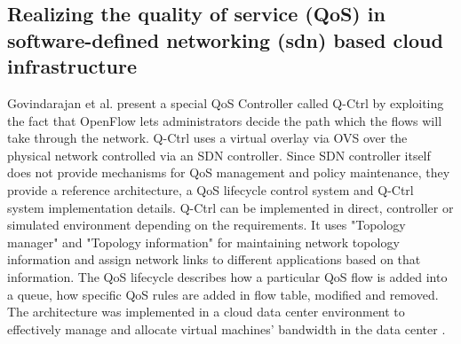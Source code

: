 \documentclass[paper=a4, fontsize=11pt]{scrartcl}	%
\numberwithin{equation}{section}		%
\numberwithin{figure}{section}			%
\numberwithin{table}{section}				%
\begin{document}
\subsection{Realizing the quality of service (QoS) in software-defined networking (sdn) based cloud infrastructure}
Govindarajan et al. present a special QoS Controller called Q-Ctrl by exploiting the fact that OpenFlow lets administrators decide the path which the flows will take through the network. Q-Ctrl uses a virtual overlay via OVS over the physical network controlled via an SDN controller. Since SDN controller itself does not provide mechanisms for QoS management and policy maintenance, they provide a reference architecture, a QoS lifecycle control system and Q-Ctrl system implementation details. Q-Ctrl can be implemented in direct, controller or simulated environment depending on the requirements. It uses "Topology manager" and "Topology information" for maintaining network topology information and assign network links to different applications based on that information. The QoS lifecycle describes how a particular QoS flow is added into a queue, how specific QoS rules are added in flow table, modified and removed. The architecture was implemented in a cloud data center environment to effectively manage and allocate virtual machines' bandwidth in the data center \cite{qctrl}.
\end{document}
